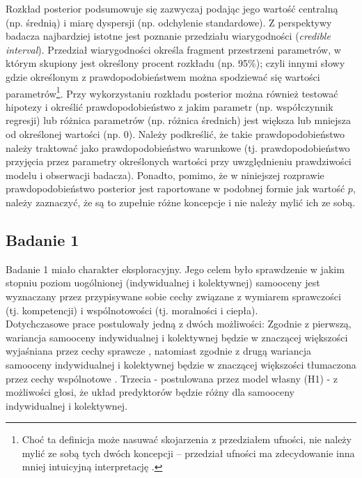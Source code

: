 \documentclass[man]{apa6}
\begin{document}
Rozkład posterior podsumowuje się zazwyczaj podając jego wartość centralną (np. średnią) i miarę dyspersji (np. odchylenie standardowe). Z perspektywy badacza najbardziej istotne jest poznanie przedziału wiarygodności (\emph{credible interval}). Przedział wiarygodności określa fragment przestrzeni parametrów, w którym skupiony jest określony procent rozkładu (np. 95\%); czyli innymi słowy gdzie określonym z prawdopodobieństwem można spodziewać się wartości parametrów\footnote{Choć ta definicja może nasuwać skojarzenia z przedziałem ufności, nie należy mylić ze sobą tych dwóch koncepcji -- przedział ufności ma zdecydowanie inna mniej intuicyjną interpretację \parencite[zob. np.,][]{gill2014bayesian}.}. Przy wykorzystaniu rozkładu posterior można również testować hipotezy i określić prawdopodobieństwo z jakim parametr (np. współczynnik regresji) lub różnica parametrów (np. różnica średnich) jest większa lub mniejsza od określonej wartości (np. 0). Należy podkreślić, że takie prawdopodobieństwo należy traktować jako prawdopodobieństwo warunkowe (tj. prawdopodobieństwo przyjęcia przez parametry określonych wartości przy uwzględnieniu prawdziwości modelu i obserwacji badacza). Ponadto, pomimo, że w niniejszej rozprawie prawdopodobieństwo posterior jest raportowane w podobnej formie jak wartość $p$, należy zaznaczyć, że są to zupełnie różne koncepcje i nie należy mylić ich ze sobą.

\newpage
\subsection{Badanie 1}

Badanie 1 miało charakter eksploracyjny. Jego celem było sprawdzenie w jakim stopniu poziom uogólnionej (indywidualnej i kolektywnej) samooceny jest wyznaczany przez przypisywane sobie cechy związane z wymiarem sprawczości (tj. kompetencji) i wspólnotowości (tj. moralności i ciepła).\\

Dotychczasowe prace postulowały jedną z dwóch możliwości: Zgodnie z pierwszą, wariancja samooceny indywidualnej i kolektywnej będzie w znaczącej większości wyjaśniana przez cechy sprawcze \parencite{wojciszke2011self}, natomiast zgodnie z drugą wariancja samooceny indywidualnej i kolektywnej będzie w znaczącej większości tłumaczona przez cechy wspólnotowe \parencite[przede wszystkim moralność, np.][]{leach2007group}. Trzecia - postulowana przez model własny (H1) - z możliwości głosi, że układ predyktorów będzie różny dla samooceny indywidualnej i kolektywnej.\\
\end{document}
